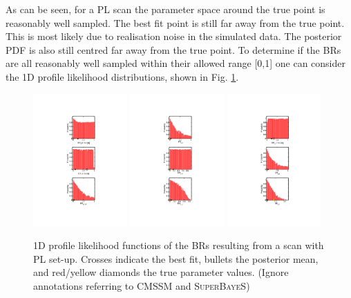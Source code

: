 \documentclass{article}
\begin{document}
As can be seen, for a PL scan the parameter space around the true point is reasonably well sampled. The best fit point is still far away from the true point. This is most likely due to realisation noise in the simulated data. The posterior PDF is also still centred far away from the true point. To determine if the BRs are all reasonably well sampled within their allowed range [0,1] one can consider the 1D profile likelihood distributions, shown in Fig. \ref{1DPLBR}. \\
\begin{figure}
\centering
\includegraphics[trim = 205 100 202 100, clip = true, width=0.32\textwidth]{figs/1D_PL_BR_1_PLscan}
\includegraphics[trim = 205 100 202 100, clip = true, width=0.32\textwidth]{figs/1D_PL_BR_2_PLscan}
\includegraphics[trim = 205 100 202 100, clip = true, width=0.32\textwidth]{figs/1D_PL_BR_3_PLscan}
\caption{1D profile likelihood functions of the BRs resulting from a scan with PL set-up. Crosses indicate the best fit, bullets the posterior mean, and red/yellow diamonds the true parameter values. (Ignore annotations referring to CMSSM and \textsc{SuperBayeS})}
\label{1DPLBR}
\end{figure}
\end{document}

